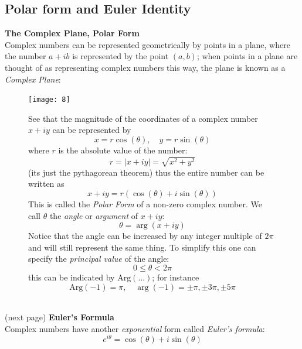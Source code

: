 \documentclass{report}
\begin{document}
\subsection{Polar form and Euler Identity}%
\textbf{The Complex Plane, Polar Form}\\
Complex numbers can be represented geometrically by points in a plane, where the number $a+ib$ is represented by 
the point $(a,b)$; when points in a plane are thought of as representing complex numbers this way,
the plane is known as a \textit{Complex Plane}:
\begin{figure}[h]
\begin{center}
\texttt{[image: 8]}\\
\end{center}
See that the magnitude of the coordinates of a complex number $x+iy$ can be represented by
\begin{equation*}
x=r\cos(\theta),\quad y=r\sin(\theta)
\end{equation*}
where $r$ is the absolute value of the number:
\begin{equation*}
r=|x+iy|=\sqrt{x^2+y^2}
\end{equation*}
(its just the pythagorean theorem) thus the entire number
can be written as
\begin{equation*}
x+iy=r(\cos(\theta)+i\sin(\theta))
\end{equation*}
This is called the \textit{Polar Form}
of a non-zero complex number. We call $\theta$ the \textit{angle} or
\textit{argument} of $x+iy$:
\begin{equation*}
\theta=\arg(x+iy)
\end{equation*}
Notice that the angle can be increased by any integer multiple of $2\pi$ and will still represent the same thing. 
To simplify this one can specify the \textit{principal value} of the angle:
\begin{equation*}
0\leq\theta<2\pi
\end{equation*}
this can be indicated by $\text{Arg}(...)$; for instance
\begin{equation*}
\text{Arg}(-1)=\pi,\quad\arg(-1)=\pm\pi,\pm3\pi,\pm5\pi
\end{equation*}
\end{figure}\\
(next page)
\newpage
\noindent\textbf{Euler's Formula}\\
Complex numbers have another \textit{exponential} form called \textit{Euler's formula}:
\begin{equation*}
e^{i\theta}=\cos(\theta)+i\sin(\theta)
\end{equation*}
\end{document}
